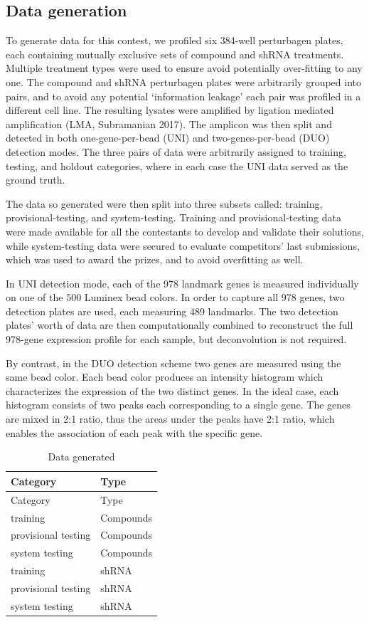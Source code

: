 \documentclass[]{article}
\begin{document}
\hypertarget{data-generation-1}{%
\subsection{Data generation}\label{data-generation-1}}

To generate data for this contest, we profiled six 384-well perturbagen
plates, each containing mutually exclusive sets of compound and shRNA
treatments. Multiple treatment types were used to ensure avoid
potentially over-fitting to any one. The compound and shRNA perturbagen
plates were arbitrarily grouped into pairs, and to avoid any potential
`information leakage' each pair was profiled in a different cell line.
The resulting lysates were amplified by ligation mediated amplification
(LMA, Subramanian 2017). The amplicon was then split and detected in
both one-gene-per-bead (UNI) and two-genes-per-bead (DUO) detection
modes. The three pairs of data were arbitrarily assigned to training,
testing, and holdout categories, where in each case the UNI data served
as the ground truth.

The data so generated were then split into three subsets called:
training, provisional-testing, and system-testing. Training and
provisional-testing data were made available for all the contestants to
develop and validate their solutions, while system-testing data were
secured to evaluate competitors' last submissions, which was used to
award the prizes, and to avoid overfitting as well.

In UNI detection mode, each of the 978 landmark genes is measured
individually on one of the 500 Luminex bead colors. In order to capture
all 978 genes, two detection plates are used, each measuring 489
landmarks. The two detection plates' worth of data are then
computationally combined to reconstruct the full 978-gene expression
profile for each sample, but deconvolution is not required.

By contrast, in the DUO detection scheme two genes are measured using
the same bead color. Each bead color produces an intensity histogram
which characterizes the expression of the two distinct genes. In the
ideal case, each histogram consists of two peaks each corresponding to a
single gene. The genes are mixed in 2:1 ratio, thus the areas under the
peaks have 2:1 ratio, which enables the association of each peak with
the specific gene.

\begin{longtable}[]{@{}ll@{}}
\caption{Data generated}\tabularnewline
\toprule
Category & Type\tabularnewline
\midrule
\endfirsthead
\toprule
Category & Type\tabularnewline
\midrule
\endhead
training & Compounds\tabularnewline
provisional testing & Compounds\tabularnewline
system testing & Compounds\tabularnewline
training & shRNA\tabularnewline
provisional testing & shRNA\tabularnewline
system testing & shRNA\tabularnewline
\bottomrule
\end{longtable}
\end{document}
